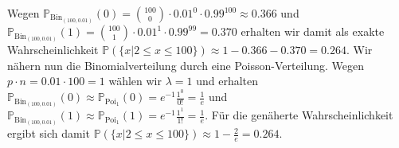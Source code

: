 \documentclass[uebung]{lecture}
\newcommand{\IP}{\mathbb{P}}
\begin{document}
\begin{aufgabe}
\begin{enumerate}[(a)]
\[        \]
        Wegen $\scriptstyle{\IP}_{\text{Bin}_{(100, 0.01)}}(0) = \binom{100}{0} \cdot 0.01^0 \cdot 0.99^100 \approx 0.366$ und $\scriptstyle{\IP}_{\text{Bin}_{(100, 0.01)}}(1) = \binom{100}{1} \cdot 0.01^1 \cdot 0.99^99 = 0.370$
        erhalten wir damit als exakte Wahrscheinlichkeit $\IP(\{x | 2 \leq x \leq 100\}) \approx 1 - 0.366 - 0.370 = 0.264$.
        Wir nähern nun die Binomialverteilung durch eine Poisson-Verteilung. Wegen $p \cdot n = 0.01 \cdot 100 = 1$ wählen wir $\lambda = 1$ und erhalten $\scriptstyle{\IP}_{\text{Bin}_{(100, 0.01)}}(0) \approx \scriptstyle{\IP}_{\text{Poi}_1}(0) = e^{-1}\frac{1^0}{0!} = \frac{1}{e}$ und $\scriptstyle{\IP}_{\text{Bin}_{(100, 0.01)}}(1) \approx \scriptstyle{\IP}_{\text{Poi}_1}(1) = e^{-1}\frac{1^1}{1!} = \frac{1}{e}$. Für die genäherte Wahrscheinlichkeit ergibt sich damit $\IP(\{x | 2 \leq x \leq 100\}) \approx 1 - \frac{2}{e} = 0.264$.
    \end{enumerate}
\end{aufgabe}
\end{document}
